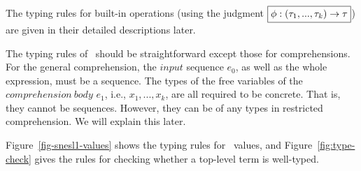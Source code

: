 

The typing rules for built-in operations (using the judgment $\boxed{\phi : (\tau_1,...,\tau_{k}) \rightarrow \tau}$) are given in their detailed descriptions later.


The typing rules of \mysnesl \ should be straightforward except those for comprehensions. 
For the general comprehension, the $input$ sequence $e_0$, as well as the whole expression, must be a sequence.
The types of the free variables of the $ comprehension \ body$ $e_1$, i.e., $x_1,...,x_k$, are all required to be concrete. 
That is, they cannot be sequences.
However, they can be of any types in restricted comprehension.
We will explain this later.
 
 
Figure~\ref{fig-snesl1-values} shows the typing rules for \mysnesl \ values, and Figure~\ref{fig:type-check} gives the rules for checking whether a top-level term is well-typed.

